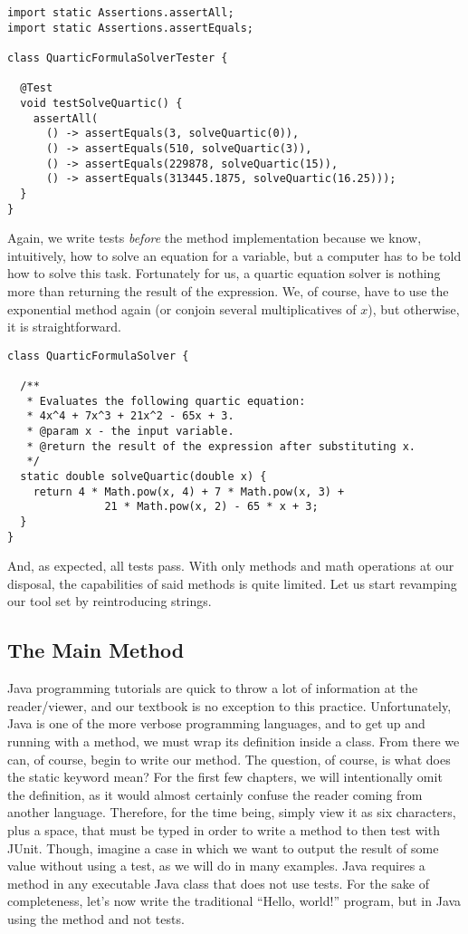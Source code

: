 \begin{lstlisting}[language=MyJava]
import static Assertions.assertAll;
import static Assertions.assertEquals;

class QuarticFormulaSolverTester {

  @Test
  void testSolveQuartic() {
    assertAll(
      () -> assertEquals(3, solveQuartic(0)),
      () -> assertEquals(510, solveQuartic(3)),
      () -> assertEquals(229878, solveQuartic(15)),
      () -> assertEquals(313445.1875, solveQuartic(16.25)));
  }
}
\end{lstlisting}

Again, we write tests \emph{before} the method implementation because we know, intuitively, how to solve an equation for a variable, but a computer has to be told how to solve this task. Fortunately for us, a quartic equation solver is nothing more than returning the result of the expression. We, of course, have to use the exponential  method again (or conjoin several multiplicatives of $x$), but otherwise, it is straightforward.

\enlargethispage{\baselineskip}
\begin{lstlisting}[language=MyJava]
class QuarticFormulaSolver {

  /**
   * Evaluates the following quartic equation:
   * 4x^4 + 7x^3 + 21x^2 - 65x + 3.
   * @param x - the input variable.
   * @return the result of the expression after substituting x.
   */
  static double solveQuartic(double x) {
    return 4 * Math.pow(x, 4) + 7 * Math.pow(x, 3) + 
               21 * Math.pow(x, 2) - 65 * x + 3;
  }
}
\end{lstlisting}

And, as expected, all tests pass. With only methods and math operations at our disposal, the capabilities of said methods is quite limited. Let us start revamping our tool set by reintroducing strings.

\subsection{The Main Method}
Java programming tutorials are quick to throw a lot of information at the reader/viewer, and our textbook is no exception to this practice. Unfortunately, Java is one of the more verbose programming languages, and to get up and running with a method, we must wrap its definition inside a class. From there we can, of course, begin to write our  method. The question, of course, is what does the static keyword mean? For the first few chapters, we will intentionally omit the definition, as it would almost certainly confuse the reader coming from another language. Therefore, for the time being, simply view it as six characters, plus a space, that must be typed in order to write a method to then test with JUnit. Though, imagine a case in which we want to output the result of some value without using a test, as we will do in many examples. Java requires a  method in any executable Java class that does not use tests. For the sake of completeness, let's now write the traditional ``Hello, world!'' program, but in Java using the  method and not tests.

